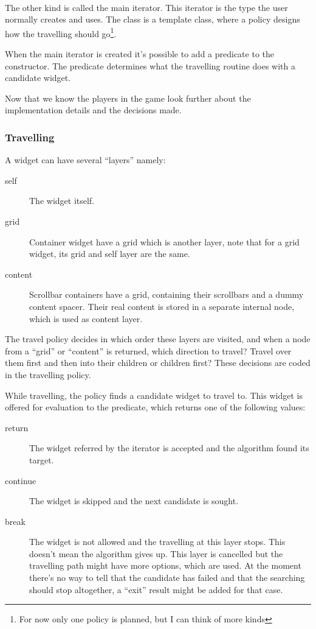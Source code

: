 \documentclass[a4paper,notitlepage,twocolumn,draft]{report}
\begin{document}
\paragraph{}

The other kind is called the main iterator. This iterator is the type the user
normally creates and uses. The class is a template class, where a policy designs
how the travelling should go\footnote{For now only one policy is planned, but I
can think of more kinds}.

When the main iterator is created it's possible to add a predicate to the
constructor. The predicate determines what the travelling routine does with a
candidate widget.

Now that we know the players in the game look further about the implementation
details and the decisions made.

\subsubsection{Travelling}

A widget can have several ``layers'' namely:

\begin{description}
\item[self] The widget itself.
\item[grid] Container widget have a grid which is another layer, note that for a
	grid widget, its grid and self layer are the same.
\item[content] Scrollbar containers have a grid, containing their scrollbars and
	a dummy content spacer. Their real content is stored in a separate internal
	node, which is used as content layer.
\end{description}

The travel policy decides in which order these layers are visited, and when a
node from a ``grid'' or ``content'' is returned, which direction to travel?
Travel over them first and then into their children or children first? These
decisions are coded in the travelling policy.

While travelling, the policy finds a candidate widget to travel to. This widget is
offered for evaluation to the predicate, which returns one of the following
values:

\begin{description}
\item[return] The widget referred by the iterator is accepted and the algorithm
	found its target.
\item[continue] The widget is skipped and the next candidate is sought.
\item[break] The widget is not allowed and the travelling at this layer stops.
	This doesn't mean the algorithm gives up. This layer is cancelled but the
	travelling path might have more options, which are used. At the moment there's
	no way to tell that the candidate has failed and that the searching should stop
	altogether, a ``exit'' result might be added for that case.
\end{description}
\end{document}
